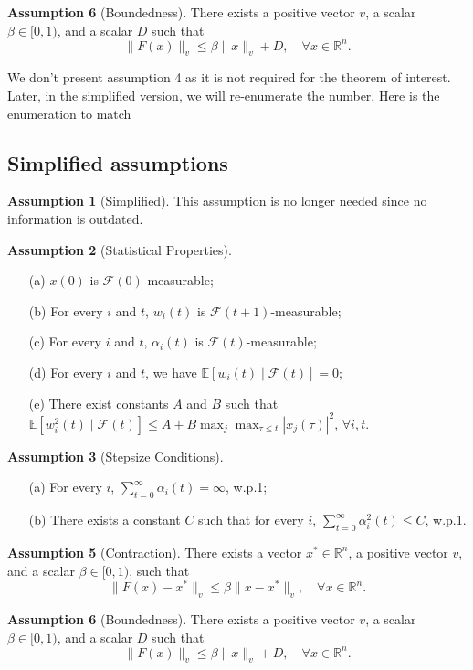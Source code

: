\noindent
\textbf{Assumption 6} (Boundedness).
There exists a positive vector $v$, a scalar $\beta \in [0,1)$, and a scalar $D$ such that
\begin{equation}
\|F(x)\|_v \leq \beta\|x\|_v + D, \quad \forall x \in \mathbb{R}^n.
\end{equation}
\begin{remark}
    We don't present assumption 4 as it is not required for the theorem of interest. Later, in the simplified version, we will re-enumerate the number. Here is the enumeration to match \cite{tsitsiklis1994asynchronous}
\end{remark}
\subsection{Simplified assumptions}
\noindent
\textbf{Assumption 1} (Simplified).
This assumption is no longer needed since no information is outdated.
\vspace{1em}

\noindent
\textbf{Assumption 2} (Statistical Properties).
\begin{enumerate}
\item[(a)] $x(0)$ is $\mathcal{F}(0)$-measurable;
\item[(b)] For every $i$ and $t$, $w_i(t)$ is $\mathcal{F}(t+1)$-measurable;
\item[(c)] For every $i$ and $t$, $\alpha_i(t)$ is $\mathcal{F}(t)$-measurable;
\item[(d)] For every $i$ and $t$, we have $\mathbb{E}[w_i(t) \mid \mathcal{F}(t)] = 0$;
\item[(e)] There exist constants $A$ and $B$ such that
$\mathbb{E}[w_i^2(t) \mid \mathcal{F}(t)] \leq A + B \max_j \max_{\tau \leq t} |x_j(\tau)|^2$, $\forall i, t$.
\end{enumerate}

\vspace{1em}

\noindent
\textbf{Assumption 3} (Stepsize Conditions).
\begin{enumerate}
\item[(a)] For every $i$, $\sum_{t=0}^{\infty} \alpha_i(t) = \infty$, w.p.1;
\item[(b)] There exists a constant $C$ such that for every $i$, $\sum_{t=0}^{\infty} \alpha_i^2(t) \leq C$, w.p.1.
\end{enumerate}

\vspace{1em}

\noindent
\textbf{Assumption 5} (Contraction).
There exists a vector $x^* \in \mathbb{R}^n$, a positive vector $v$, and a scalar $\beta \in [0,1)$, such that
\begin{equation}
\|F(x) - x^*\|_v \leq \beta \|x - x^*\|_v, \quad \forall x \in \mathbb{R}^n.
\end{equation}

\vspace{1em}

\noindent
\textbf{Assumption 6} (Boundedness).
There exists a positive vector $v$, a scalar $\beta \in [0,1)$, and a scalar $D$ such that
\begin{equation}
\|F(x)\|_v \leq \beta\|x\|_v + D, \quad \forall x \in \mathbb{R}^n.
\end{equation}
